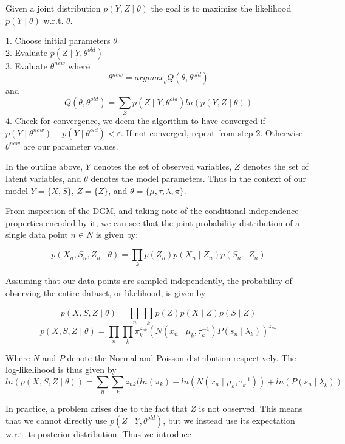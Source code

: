 \documentclass[11pt,a4paper]{article}
\begin{document}
Given a joint distribution $p(Y, Z \mid \theta)$ the goal is to maximize the likelihood $p(Y \mid \theta)$ w.r.t. $\theta$.
\begin{flushleft}

1.	Choose initial parameters $\theta$\\
2. 	Evaluate $p(Z \mid Y, \theta^{old})$\\
3.	Evaluate $\theta^{new}$ where
$$ \theta^{new} = {arg max}_{\theta} Q(\theta, \theta^{old})$$
and
$$ Q(\theta, \theta^{old}) = \sum_{Z} p(Z \mid Y, \theta^{old})ln(p(Y, Z \mid \theta))$$
4.	Check for convergence, we deem the algorithm to have converged if $p(Y \mid \theta^{new}) - p(Y \mid \theta^{old}) < \varepsilon $. If not converged, repeat from step 2. Otherwise $\theta^{new}$ are our parameter values.

\end{flushleft}

In the outline above, $Y$ denotes the set of observed variables, $Z$ denotes the set of latent variables, and $\theta$ denotes the model parameters. Thus in the context of our model $Y = \lbrace X, S\rbrace$, $Z = \lbrace Z \rbrace$, and $\theta = \lbrace \mu, \tau, \lambda, \pi\rbrace$.

From inspection of the DGM, and taking note of the conditional independence properties encoded by it, we can see that the joint probability distribution of a single data point $n \in N$ is given by:

$$ p(X_{n}, S_{n}, Z_{n} \mid \theta) = \prod_{k} p(Z_{n})p(X_{n} \mid Z_{n})p(S_{n} \mid Z_{n}) $$

Assuming that our data points are sampled independently, the probability of observing the entire dataset, or likelihood, is given by

$$ p(X, S, Z \mid \theta) = \prod_{n} \prod_{k} p(Z)p(X \mid Z)p(S \mid Z) $$
$$ p(X, S, Z \mid \theta) = \prod_{n} \prod_{k} \pi_{k}^{z_{nk}}(N(x_{n} \mid \mu_{k}, \tau_{k}^{-1})P(s_{n} \mid \lambda_{k}))^{z_{nk}} $$

Where $N$ and $P$ denote the Normal and Poisson distribution respectively. The log-likelihood is thus given by
$$ln(p(X, S, Z \mid \theta)) = \sum_{n} \sum_{k} z_{nk}(ln(\pi_{k}) + ln(N(x_{n} \mid \mu_{k}, \tau_{k}^{-1})) + ln(P(s_{n} \mid \lambda_{k})) $$

In practice, a problem arises due to the fact that $Z$ is not observed. This means that we cannot directly use $p(Z \mid Y, \theta^{old})$, but we instead use its expectation w.r.t its posterior distribution. Thus we introduce 
\end{document}
